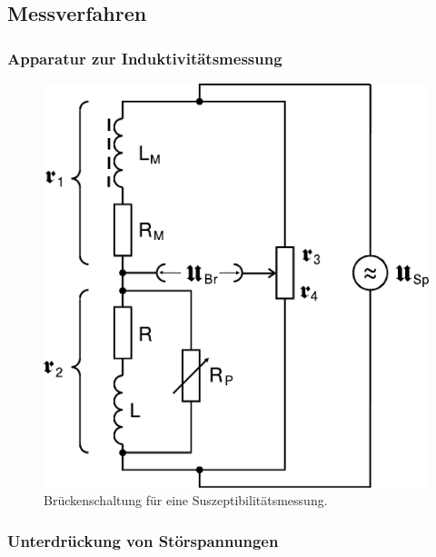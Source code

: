 \subsection{Messverfahren}

\subsubsection{Apparatur zur Induktivitätsmessung}

\begin{figure}[H]
	\centering
	\includegraphics{content/grafik/schaltung.pdf}
	\caption{Brückenschaltung für eine Suszeptibilitätsmessung.}
	\label{fig:schaltung}
\end{figure}

\subsubsection{Unterdrückung von Störspannungen}


